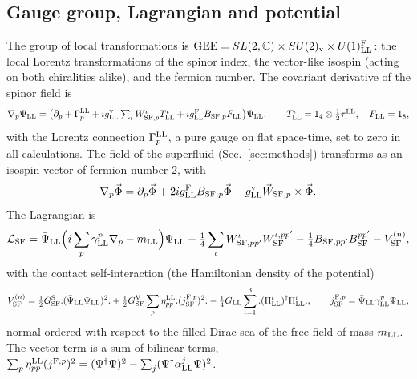 \documentclass[aps,prd,onecolumn,superscriptaddress,nofootinbib,floatfix,longbibliography]{revtex4-2}
\newcommand{\LL}{{\rm LL}}
\newcommand{\SF}{{\rm SF}}
\begin{document}
\subsection{Gauge group, Lagrangian and potential}

The group of local transformations is ${\rm GEE}=SL(2,\mathbb C)\times SU(2)_{\rm v}\times U(1)^{\rm F}_\LL$: the local Lorentz
transformations of the spinor index, the vector-like isospin (acting on both chiralities alike), and the fermion number.
The covariant derivative of the spinor field is
\begin{equation}
\nabla_p\Psi_\LL=\big(\partial_p+\Gamma^\LL_p+ig^{\rm v}_\LL\textstyle\sum_\iota W^\iota_{\SF,p}T^\iota_\LL+ig^{\rm F}_\LL B_{\SF,p}F_\LL\big)\Psi_\LL,
\qquad T^\iota_\LL=\mathsf 1_4\otimes\tfrac12\tau^\LL_\iota,\quad F_\LL=\mathsf 1_8,
\label{eq:cov}
\end{equation}
with the Lorentz connection $\Gamma^\LL_p$, a pure gauge on flat space-time, set to zero in all calculations. The field of the
superfluid (Sec.~\ref{sec:methods}) transforms as an isospin vector of fermion number 2, with
\begin{equation}
\nabla_p\vec\Phi=\partial_p\vec\Phi+2ig^{\rm F}_\LL B_{\SF,p}\vec\Phi-g^{\rm v}_\LL\vec W_{\SF,p}\times\vec\Phi .
\label{eq:covPhi}
\end{equation}
The Lagrangian is
\begin{equation}
\mathcal L_\SF=\bar\Psi_\LL\Big(i\sum_p\gamma^p_\LL\nabla_p-m_\LL\Big)\Psi_\LL-\tfrac14\sum_\iota W^\iota_{\SF,pp'}W^{\iota,pp'}_\SF-\tfrac14B_{\SF,pp'}B^{pp'}_\SF-V^{(n)}_\SF ,
\label{eq:L}
\end{equation}
with the contact self-interaction (the Hamiltonian density of the potential)
\begin{equation}
V^{(n)}_\SF=\tfrac12G^{\rm S}_\SF{:}(\bar\Psi_\LL\Psi_\LL)^2{:}+\tfrac12G^{\rm V}_\SF\sum_p\eta^\LL_{pp}{:}(j^{{\rm F},p}_\SF)^2{:}-\tfrac14G_\LL\sum_{\iota=1}^3{:}(\Pi^\iota_\LL)^\dagger\Pi^\iota_\LL{:},
\qquad j^{{\rm F},p}_\SF=\bar\Psi_\LL\gamma^p_\LL\Psi_\LL ,
\label{eq:V}
\end{equation}
normal-ordered with respect to the filled Dirac sea of the free field of mass $m_\LL$. The vector term is a sum of bilinear
terms, $\sum_p\eta^\LL_{pp}(j^{{\rm F},p})^2=(\Psi^\dagger\Psi)^2-\sum_j(\Psi^\dagger\alpha^j_\LL\Psi)^2$.
\end{document}
